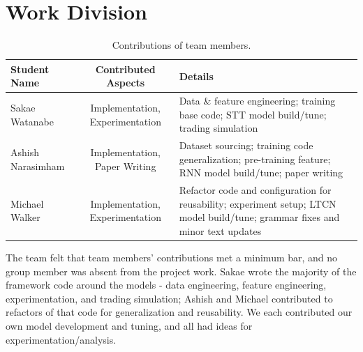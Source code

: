 \documentclass[10pt,twocolumn,letterpaper]{article}
\begin{document}



\clearpage
\section{Work Division}

\begin{table}
    \begin{center}
\begin{tabular}{|l|c|p{8cm}|}
\hline
Student Name & Contributed Aspects & Details \\
\hline
Sakae Watanabe & Implementation, Experimentation & Data \& feature engineering; training base code; STT model build/tune; trading simulation\\
\hline
Ashish Narasimham & Implementation, Paper Writing & Dataset sourcing; training code generalization; pre-training feature; RNN model build/tune; paper writing \\
\hline
Michael Walker & Implementation, Experimentation & Refactor code and configuration for reusability; experiment setup; LTCN model build/tune; grammar fixes and minor text updates \\
\hline
\end{tabular}
    \end{center}
\caption{Contributions of team members.}
\label{tab:contributions}
\end{table}

The team felt that team members’ contributions met a minimum bar, and no group member was absent from the project work. Sakae wrote the majority of the framework code around the models - data engineering, feature engineering, experimentation, and trading simulation; Ashish and Michael contributed to refactors of that code for generalization and reusability. We each contributed our own model development and tuning, and all had ideas for experimentation/analysis.
\end{document}
